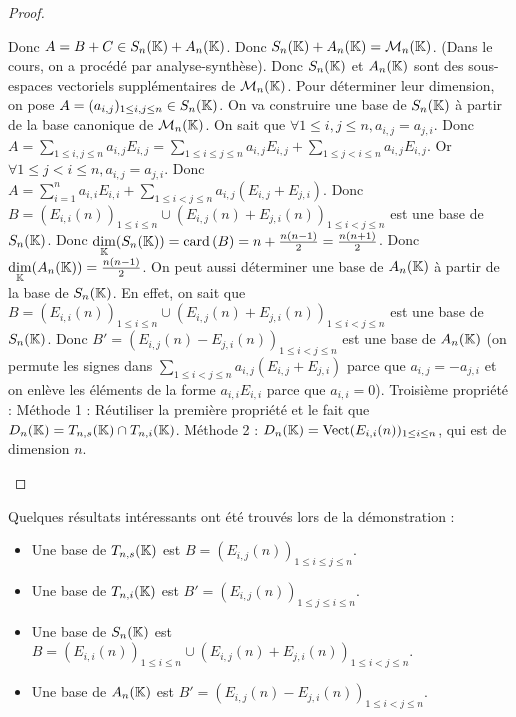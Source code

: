 \documentclass[12pt, a4paper]{report}
\begin{document}
\begin{proof}
\begin{outline}
            \3 Donc $A = B + C \in S_n(\mathbb{K}) + A_n(\mathbb{K})$.
            \3 Donc $S_n(\mathbb{K}) + A_n(\mathbb{K}) = \mathcal M_n(\mathbb{K})$. (Dans le cours, on a procédé par analyse-synthèse).
            \2 Donc $S_n(\mathbb{K})$ et $A_n(\mathbb{K})$ sont des sous-espaces vectoriels supplémentaires de $\mathcal M_n(\mathbb{K})$.
            \2 Pour déterminer leur dimension, on pose $A = (a_{i,j})_{1 \le i,j \le n} \in S_n(\mathbb{K})$.
            \2 On va construire une base de $S_n(\mathbb{K})$ à partir de la base canonique de $\mathcal M_n(\mathbb{K})$.
            \3 On sait que $\forall 1 \le i,j \le n, a_{i,j} = a_{j,i}$.
            \3 Donc $A = \sum_{1 \le i,j \le n} a_{i,j} E_{i,j} = \sum_{1 \le i \le j \le n} a_{i,j} E_{i,j} + \sum_{1 \le j < i \le n} a_{i,j} E_{i,j}$.
            \3 Or $\forall 1 \le j < i \le n, a_{i,j} = a_{j,i}$.
            \3 Donc $A = \sum_{i=1}^n a_{i,i} E_{i,i} + \sum_{1 \le i < j \le n} a_{i,j} (E_{i,j} + E_{j,i})$.
            \3 Donc $B = (E_{i,i}(n))_{1 \le i \le n} \cup (E_{i,j}(n) + E_{j,i}(n))_{1 \le i < j \le n}$ est une base de $S_n(\mathbb{K})$.
            \2 Donc $\underset{\mathbb{K}}\dim(S_n(\mathbb{K})) = \mathrm{card}\left(B\right) = n + \frac{n(n-1)}{2} = \frac{n(n+1)}{2}$.
            \2 Donc $\underset{\mathbb{K}}\dim(A_n(\mathbb{K})) = \frac{n(n-1)}{2}$.
            \3 On peut aussi déterminer une base de $A_n(\mathbb{K})$ à partir de la base de $S_n(\mathbb{K})$.
            \3 En effet, on sait que $B = (E_{i,i}(n))_{1 \le i \le n} \cup (E_{i,j}(n) + E_{j,i}(n))_{1 \le i < j \le n}$ est une base de $S_n(\mathbb{K})$.
            \3 Donc $B' = (E_{i,j}(n) - E_{j,i}(n))_{1 \le i < j \le n}$ est une base de $A_n(\mathbb{K})$ (on permute les signes dans $\sum_{1 \le i < j \le n} a_{i,j} (E_{i,j} + E_{j,i})$ parce que $a_{i,j} = -a_{j,i}$ et on enlève les éléments de la forme $a_{i,i} E_{i,i}$ parce que $a_{i,i} = 0$).
        \1 Troisième propriété :
            \2 Méthode 1 : Réutiliser la première propriété et le fait que $D_n(\mathbb{K}) = T_{n,s}(\mathbb{K}) \cap T_{n,i}(\mathbb{K})$.
            \2 Méthode 2 : $D_n(\mathbb{K}) = \mathrm{Vect}(E_{i,i}(n))_{1 \le i \le n}$, qui est de dimension $n$.
    \end{outline}
\end{proof}

\begin{methodbox}
    Quelques résultats intéressants ont été trouvés lors de la démonstration :
    \begin{itemize}
        \item Une base de $T_{n,s}(\mathbb{K})$ est $B = (E_{i,j}(n))_{1 \le i \le j \le n}$.
        \item Une base de $T_{n,i}(\mathbb{K})$ est $B' = (E_{i,j}(n))_{1 \le j \le i \le n}$.
        \item Une base de $S_n(\mathbb{K})$ est $B = (E_{i,i}(n))_{1 \le i \le n} \cup (E_{i,j}(n) + E_{j,i}(n))_{1 \le i < j \le n}$.
        \item Une base de $A_n(\mathbb{K})$ est $B' = (E_{i,j}(n) - E_{j,i}(n))_{1 \le i < j \le n}$.
    \end{itemize}
\end{methodbox}
\end{document}
